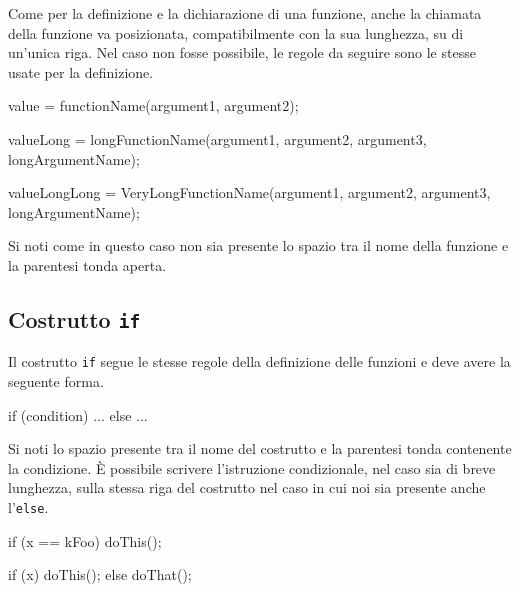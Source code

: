 Come per la definizione e la dichiarazione di una funzione, anche la chiamata della funzione va posizionata, compatibilmente con la sua lunghezza, su di un'unica riga.
Nel caso non fosse possibile, le regole da seguire sono le stesse usate per la definizione.

\begin{minipage}[t]{\rbwidth}
\begin{RightCode}
value = functionName(argument1, argument2);

valueLong = longFunctionName(argument1, argument2, argument3,
                             longArgumentName);

valueLongLong = VeryLongFunctionName(argument1,
                                     argument2,
                                     argument3,
                                     longArgumentName);
\end{RightCode}
\end{minipage}%

Si noti come in questo caso non sia presente lo spazio tra il nome della funzione e la parentesi tonda aperta.

\subsection{Costrutto \texttt{if}}

Il costrutto \texttt{if} segue le stesse regole della definizione delle funzioni e deve avere la seguente forma.

\begin{minipage}[t]{\rbwidth}
\begin{RightCode}
if (condition)
{
  ...
}
else
{
  ...
}
\end{RightCode}
\end{minipage}%

Si noti lo spazio presente tra il nome del costrutto e la parentesi tonda contenente la condizione.
È possibile scrivere l'istruzione condizionale, nel caso sia di breve lunghezza, sulla stessa riga del costrutto nel caso in cui noi sia presente anche l'\texttt{else}.

\begin{minipage}[t]{\cbwidth}
\begin{RightCode}
if (x == kFoo) doThis();
\end{RightCode}
\end{minipage}%
\hspace{\cbdistance}
\begin{minipage}[t]{\cbwidth}
\begin{ErrorCode}
if (x) doThis();
else doThat();
\end{ErrorCode}
\end{minipage}

